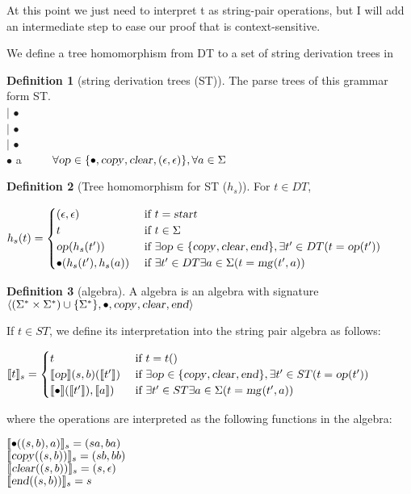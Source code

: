 \documentclass[12pt]{article}
\theoremstyle{definition}
\newtheorem{definition}{Definition}[section]
\begin{document}
At this point we just need to interpret t as string-pair operations, but I will add an intermediate step to ease our proof that \OURG is context-sensitive.

We define a tree homomorphism from DT to a set of string derivation trees in

\begin{definition}[string derivation trees (ST)]
  The parse trees of this grammar form ST.\\
  
\noindent  \cp \arr \cp $|$ $\bullet$\\
  \cl \arr \cp $|$ $\bullet$\\
  \ed \arr \cp $|$ $\bullet$\\
  $\bullet$ \arr \op a ~~~~ $\forall \text{\textsl{op}}\in \{\bullet,\text{\textsl{copy}},\text{\textsl{clear}},(\epsilon,\epsilon)\}, \forall a\in\Sigma$
\end{definition}


\begin{definition}[Tree homomorphism for ST ($h_s$)]

  For $t\in DT$, 
  
  $
  h_s(t) =
  \begin{cases}
    (\epsilon,\epsilon) & \text{ if } t = \text{\textsl{start}}\\
    t & \text{ if } t\in\Sigma\\
    \text{\textsl{op}}(h_s(t')) & \text{ if } \exists \text{\textsl{op}} \in \{\text{\textsl{copy}},\text{\textsl{clear}},\text{\textsl{end}}\}, \exists t'\in DT (t=\text{\textsl{op}}(t'))\\
    \bullet(h_s(t'), h_s(a)) & \text{ if } \exists t'\in DT \exists a\in\Sigma (t=\text{\textsl{mg}}(t',a))\\
  \end{cases}
  $
\end{definition}


\begin{definition}[\OURG algebra]
  A \CATH algebra is an algebra with signature $\langle (\Sigma^*\times\Sigma^*)\cup\{\Sigma^*\},\bullet,\text{\textsl{copy}},\text{\textsl{clear}},\text{\textsl{end}}\rangle$
  
  If $t\in ST$, we define its interpretation into the string pair algebra as follows:

   $
  \llbracket t \rrbracket_s =
  \begin{cases}
    t & \text{ if } t = t()\\
    \llbracket\text{\textsl{op}}\rrbracket(s,b)(\llbracket t'\rrbracket) & \text{ if } \exists \text{\textsl{op}} \in \{\text{\textsl{copy}},\text{\textsl{clear}},\text{\textsl{end}}\}, \exists t'\in ST (t=\text{\textsl{op}}(t'))\\
    \llbracket\bullet\rrbracket(\llbracket t'\rrbracket), \llbracket a\rrbracket) & \text{ if } \exists t'\in ST \exists a\in\Sigma (t=\text{\textsl{mg}}(t',a))\\
  \end{cases}
  $

  where the operations are interpreted as the following functions in the algebra:
  
\noindent  $\llbracket\bullet((s,b),a)\rrbracket_s = (sa,ba)$\\  
  $\llbracket\text{\textsl{copy}}((s,b))\rrbracket_s = (sb,bb)$\\
  $\llbracket\text{\textsl{clear}}((s,b))\rrbracket_s = (s,\epsilon)$\\
  $\llbracket\text{\textsl{end}}((s,b))\rrbracket_s = s$\\

  
\end{definition}
\end{document}

